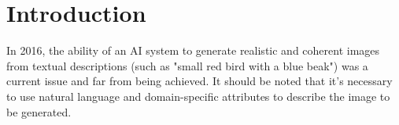 
\section*{Introduction}

In 2016, the ability of an AI system to generate realistic and 
coherent images from textual descriptions 
(such as "small red bird with a blue beak") was a current issue and 
far from being achieved.
It should be noted that it's necessary to use natural language 
and domain-specific attributes to describe the image to be generated.



